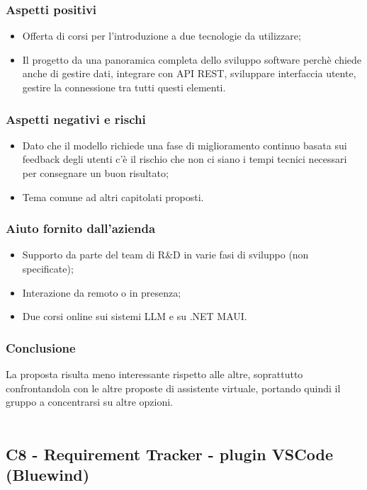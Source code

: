 \documentclass[10pt]{article}
\begin{document}
\subsubsection{Aspetti positivi}
\begin{itemize}
    \item Offerta di corsi per l’introduzione a due tecnologie da utilizzare;
    \item Il progetto da una panoramica completa dello sviluppo software perchè chiede anche di gestire dati, integrare con API REST, sviluppare interfaccia utente, gestire la connessione tra tutti questi elementi.
\end{itemize}
\subsubsection{Aspetti negativi e rischi}
\begin{itemize}
    \item Dato che il modello richiede una fase di miglioramento continuo basata sui feedback degli utenti c’è il rischio che non ci siano i tempi tecnici necessari per consegnare un buon risultato;
    \item Tema comune ad altri capitolati proposti.
\end{itemize}
\subsubsection{Aiuto fornito dall'azienda}
\begin{itemize}
\item Supporto da parte del team di R\&D in varie fasi di sviluppo (non specificate);
\item Interazione da remoto o in presenza;
\item Due corsi online sui sistemi LLM e su .NET MAUI.

\end{itemize}
\subsubsection{Conclusione}
La proposta risulta meno interessante rispetto alle altre, soprattutto confrontandola con le altre proposte di assistente virtuale, portando quindi il gruppo a concentrarsi su altre opzioni.
\\\\

\subsection{C8 - Requirement Tracker - plugin VSCode (Bluewind)}
\end{document}
